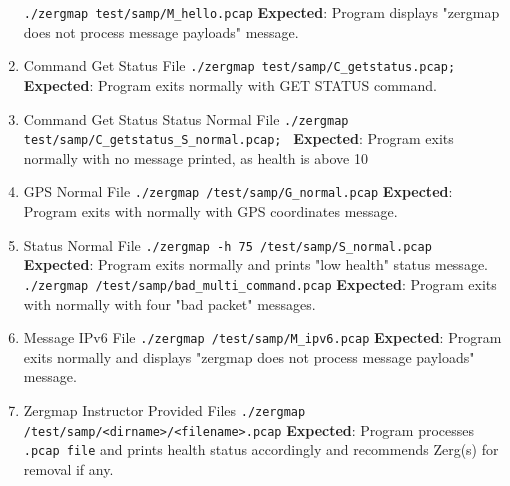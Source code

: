 \documentclass[12pt]{article}
\begin{document}
\begin{enumerate}
    \newline
        \lstinline|./zergmap test/samp/M_hello.pcap|
        \newline
            \textbf{Expected}: Program displays "zergmap does not process message payloads" message.
    \item Command Get Status File
    \newline
        \lstinline|./zergmap test/samp/C_getstatus.pcap; |
        \newline
            \textbf{Expected}: Program exits normally with GET STATUS command.
    \item Command Get Status Status Normal File
    \newline
        \lstinline|./zergmap test/samp/C_getstatus_S_normal.pcap; |
        \newline
            \textbf{Expected}: Program exits normally with no message printed, as health is above 10%
    \item GPS Normal File
    \newline
        \lstinline|./zergmap /test/samp/G_normal.pcap|
        \newline
            \textbf{Expected}: Program exits with normally with GPS coordinates message. 
    \item Status Normal File
    \newline
        \lstinline|./zergmap -h 75 /test/samp/S_normal.pcap|
        \newline
            \textbf{Expected}: Program exits normally and prints "low health" status message.
    \newline
        \lstinline|./zergmap /test/samp/bad_multi_command.pcap|
        \newline
            \textbf{Expected}: Program exits with normally with four "bad packet" messages. 
    \item Message IPv6 File
    \newline
        \lstinline|./zergmap /test/samp/M_ipv6.pcap|
        \newline
            \textbf{Expected}: Program exits normally and displays "zergmap does not process message payloads" message.
    \item Zergmap Instructor Provided Files
    \newline
        \lstinline|./zergmap /test/samp/<dirname>/<filename>.pcap|
        \newline
            \textbf{Expected}: Program processes \lstinline|.pcap file| and prints health status accordingly and recommends Zerg(s) for removal if any.
\end{enumerate}
\end{document}
